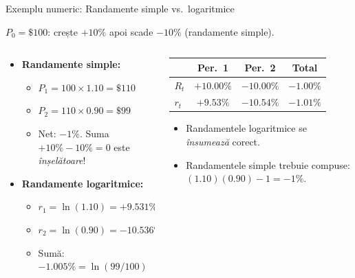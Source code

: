 \documentclass[9pt, aspectratio=169, t]{beamer}
\theoremstyle{definition}
\begin{document}
\begin{frame}{Exemplu numeric: Randamente simple vs.\ logaritmice}
\begin{example}
$P_0 = \$100$: crește $+10\%$ apoi scade $-10\%$ (randamente simple).
\end{example}
\vspace{0.1cm}
\begin{columns}[T]
\begin{column}{0.48\textwidth}
\begin{itemize}
    \item \textbf{Randamente simple:}
    \begin{itemize}
        \item $P_1 = 100 \times 1.10 = \$110$
        \item $P_2 = 110 \times 0.90 = \$99$
        \item Net: $-1\%$. Suma $+10\%-10\%=0$ este \textit{înșelătoare}!
    \end{itemize}
    \item \textbf{Randamente logaritmice:}
    \begin{itemize}
        \item $r_1 = \ln(1.10) = +9.531\%$
        \item $r_2 = \ln(0.90) = -10.536\%$
        \item Sumă: $-1.005\% = \ln(99/100)$ \checkmark
    \end{itemize}
\end{itemize}
\end{column}
\begin{column}{0.48\textwidth}
\begin{center}
{\small
\renewcommand{\arraystretch}{1.3}
\begin{tabular}{lccc}
\toprule
 & Per.\ 1 & Per.\ 2 & \textbf{Total} \\
\midrule
$R_t$ & $+10.00\%$ & $-10.00\%$ & $-1.00\%$ \\
$r_t$ & $+9.53\%$ & $-10.54\%$ & $-1.01\%$ \\
\bottomrule
\end{tabular}
}
\end{center}
\vspace{0.2cm}
\begin{itemize}
    \item Randamentele logaritmice se \textit{însumează} corect.
    \item Randamentele simple trebuie compuse: $(1.10)(0.90)-1=-1\%$.
\end{itemize}
\end{column}
\end{columns}
\end{frame}
\end{document}
